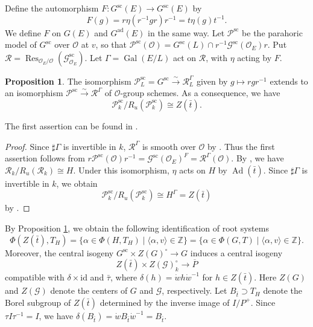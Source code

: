 \documentclass[12pt]{article}
\DeclareMathOperator{\ad}{ad}
\DeclareMathOperator{\Ad}{Ad}
\newcommand\cO{\mathcal O}
\newcommand\cG{\mathcal G}
\newcommand\Z{\mathbb Z}
\theoremstyle{definition}
\newtheorem{prop}[theo]{Proposition}
\DeclareMathOperator{\Gal}{Gal}
\newcommand{\scs}{\mathrm{sc}}
\begin{document}
Define the automorphism $F\colon G^{\scs}(E)\longrightarrow G^{\scs}(E)$ by
$$
F(g)=r\eta(r^{-1}gr)r^{-1}=t\eta(g)t^{-1}.
$$
We define $F$ on $G(E)$ and $G^{\ad}(E)$ in the same way.
Let $\mathcal P^{\scs}$ be the parahoric model of $G^{\scs}$ over $\cO$ at $v$, so that $\mathcal P^{\scs}(\cO)=G^{\scs}(L)\cap r^{-1}\cG^{\scs}(\cO_E)r$.
Put $\mathcal R=\operatorname{Res}_{\cO_E/\cO}(\cG^{\scs}_{\cO_E})$.
Let $\Gamma=\Gal(E/L)$ act on $\mathcal R$, with $\eta$ acting by $F$.
\begin{prop}\label{parahoric-descent}
The isomorphism $\mathcal P^{\scs}_L=G^{\scs}\xrightarrow{\sim}\mathcal R_L^\Gamma$ given by $g\mapsto rgr^{-1}$ extends to an isomorphism $\mathcal P^{\scs}\xrightarrow{\sim}\mathcal R^\Gamma$ of $\cO$-group schemes.
As a consequence, we have
$$
\mathcal P^{\scs}_k/R_u(\mathcal P^{\scs}_k)\cong Z(\bar t).
$$
\end{prop}

The first assertion can be found in \cite[Proposition 2.8]{PR24}.

\begin{proof}
Since $\sharp\Gamma$ is invertible in $k$, $\mathcal R^\Gamma$ is smooth over $\cO$ by \cite[Proposition 3.4]{Edi92}.
Thus the first assertion follows from $r\mathcal P^{\scs}(\cO)r^{-1}=\cG^{\scs}(\cO_E)^F=\mathcal R^\Gamma(\cO)$.
By \cite[Proposition 9.11.1(3)]{KP23}, we have $\mathcal R_k/R_u(\mathcal R_k)\cong H$.
Under this isomorphism, $\eta$ acts on $H$ by $\Ad(\bar t)$.
Since $\sharp\Gamma$ is invertible in $k$, we obtain
$$
\mathcal P^{\scs}_k/R_u(\mathcal P^{\scs}_k)\cong H^\Gamma=Z(\bar t)
$$
by \cite[Lemma 12.5.4(1)]{KP23}.
\end{proof}

By Proposition \ref{parahoric-descent}, we obtain the following identification of root systems
$$
\Phi(Z(\bar t),T_H)=\{\alpha\in\Phi(H,T_H)\mid\langle\alpha,v\rangle\in\Z\}=\{\alpha\in\Phi(G,T)\mid\langle\alpha,v\rangle\in\Z\}.
$$
Moreover, the central isogeny $G^{\scs}\times Z(G)^\circ\to G$ induces a central isogeny
$$
Z(\bar t)\times Z(\cG)^\circ_k\longrightarrow\overline P
$$
compatible with $\delta\times\mathrm{id}$ and $\bar\tau$, where $\delta(h)=\dot w h\dot w^{-1}$ for $h\in Z(\bar t)$.
Here $Z(G)$ and $Z(\cG)$ denote the centers of $G$ and $\cG$, respectively.
Let $B_{\bar t}\supset T_H$ denote the Borel subgroup of $Z(\bar t)$ determined by the inverse image of $I/P^+$.
Since $\tau I\tau^{-1}=I$, we have $\delta(B_{\bar t})=\dot w B_{\bar t}\dot w^{-1}=B_{\bar t}$.
\end{document}
